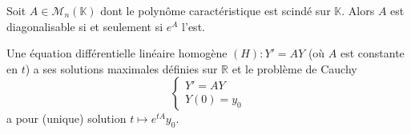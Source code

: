	\begin{application}
	  Soit $A \in \mathcal{M}_n(\mathbb{K})$ dont le polynôme caractéristique est scindé sur $\mathbb{K}$. Alors $A$ est diagonalisable si et seulement si $e^A$ l'est.
	\end{application}


	\begin{application}
		Une équation différentielle linéaire homogène $(H) : Y' = AY$ (où $A$ est constante en $t$) a ses solutions maximales définies sur $\mathbb{R}$ et le problème de Cauchy
		\[ \begin{cases} Y' = AY \\ Y(0) = y_0 \end{cases} \]
		a pour (unique) solution $t \mapsto e^{tA} y_0$.
	\end{application}

